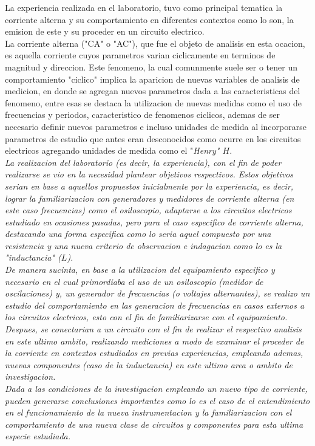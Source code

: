 \begin{resumen}
    La experiencia realizada en el laboratorio, tuvo como principal tematica la corriente alterna y su comportamiento
    en diferentes contextos como lo son, la emision de este y su proceder en un circuito electrico. \\

    La corriente alterna ("CA" o "AC"), que fue el objeto de analisis en esta ocacion, es aquella corriente cuyos
    parametros varian ciclicamente en terminos de magnitud y direccion. Este fenomeno, la cual comunmente suele ser
    o tener un comportamiento "ciclico" implica la aparicion de nuevas variables de analisis de medicion, en donde se
    agregan nuevos parametros dada a las caracteristicas del fenomeno, entre esas se destaca la utilizacion de nuevas
    medidas como el uso de frecuencias y periodos, caracteristico de fenomenos ciclicos, ademas de ser necesario definir
    nuevos parametros e incluso unidades de medida al incorporarse parametros de estudio que antes eran desconocidos
    como ocurre en los circuitos electricos agregando unidades de medida como el "\it Henry\rm" $H$. \\

    La realizacion del laboratorio (es decir, la experiencia), con el fin de poder realizarse se vio en la necesidad
    plantear objetivos respectivos. Estos objetivos serian en base a aquellos propuestos inicialmente por la
    experiencia, es decir, lograr la familiarizacion con generadores y medidores de corriente alterna (en este caso
    frecuencias) como el osiloscopio, adaptarse a los circuitos electricos estudiado en ocasiones pasadas, pero para
    el caso especifico de corriente alterna, destacando una forma especifica como lo seria aquel compuesto por una
    resistencia y una nueva criterio de observacion e indagacion como lo es la "\it inductancia\rm" ($L$). \\

    De manera sucinta, en base a la utilizacion del equipamiento especifico y necesario en el cual primordiaba el uso
    de un osiloscopio (medidor de oscilaciones) y, un generador de frecuencias (o voltajes alternantes), se realizo
    un estudio del comportamiento en las generacion de frecuencias en casos externos a los circuitos electricos, esto
    con el fin de familiarizarse con el equipamiento. Despues, se conectarian a un circuito con el fin de realizar el
    respectivo analisis en este ultimo ambito, realizando mediciones a modo de examinar el proceder de la corriente en
    contextos estudiados en previas experiencias, empleando ademas, nuevas componentes (caso de la inductancia)
    en este ultimo area o ambito de investigacion. \\

    Dada a las condiciones de la investigacion empleando un nuevo tipo de corriente, pueden generarse conclusiones
    importantes como lo es el caso de el entendimiento en el funcionamiento de la nueva instrumentacion y la
    familiarizacion con el comportamiento de una nueva clase de circuitos y componentes para esta ultima especie
    estudiada.
\end{resumen}


